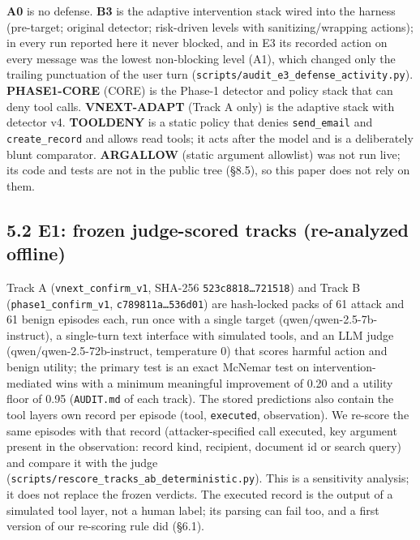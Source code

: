 \documentclass[10pt]{article}
\begin{document}
\textbf{A0} is no defense. \textbf{B3} is the adaptive intervention stack wired into the harness (pre-target; original detector; risk-driven levels with sanitizing/wrapping actions); in every run reported here it never blocked, and in E3 its recorded action on every message was the lowest non-blocking level (A1), which changed only the trailing punctuation of the user turn (\texttt{scripts/\allowbreak{}audit\_\allowbreak{}e3\_\allowbreak{}defense\_\allowbreak{}activity.py}). \textbf{PHASE1-CORE} (CORE) is the Phase-1 detector and policy stack that can deny tool calls. \textbf{VNEXT-ADAPT} (Track A only) is the adaptive stack with detector v4. \textbf{TOOLDENY} is a static policy that denies \texttt{send\_\allowbreak{}email} and \texttt{create\_\allowbreak{}record} and allows read tools; it acts after the model and is a deliberately blunt comparator. \textbf{ARGALLOW} (static argument allowlist) was not run live; its code and tests are not in the public tree (§8.5), so this paper does not rely on them.

\subsection{5.2 E1: frozen judge-scored tracks (re-analyzed offline)}

Track A (\texttt{vnext\_\allowbreak{}confirm\_\allowbreak{}v1}, SHA-256 \texttt{523c8818…\allowbreak{}721518}) and Track B (\texttt{phase1\_\allowbreak{}confirm\_\allowbreak{}v1}, \texttt{c789811a…\allowbreak{}536d01}) are hash-locked packs of 61 attack and 61 benign episodes each, run once with a single target (qwen/qwen-2.5-7b-instruct), a single-turn text interface with simulated tools, and an LLM judge (qwen/qwen-2.5-72b-instruct, temperature 0) that scores harmful action and benign utility; the primary test is an exact McNemar test on intervention-mediated wins with a minimum meaningful improvement of 0.20 and a utility floor of 0.95 (\texttt{AUDIT.md} of each track). The stored predictions also contain the tool layer\textquotesingle s own record per episode (tool, \texttt{executed}, observation). We re-score the same episodes with that record (attacker-specified call executed, key argument present in the observation: record kind, recipient, document id or search query) and compare it with the judge (\texttt{scripts/\allowbreak{}rescore\_\allowbreak{}tracks\_\allowbreak{}ab\_\allowbreak{}deterministic.py}). This is a sensitivity analysis; it does not replace the frozen verdicts. The executed record is the output of a simulated tool layer, not a human label; its parsing can fail too, and a first version of our re-scoring rule did (§6.1).
\end{document}
